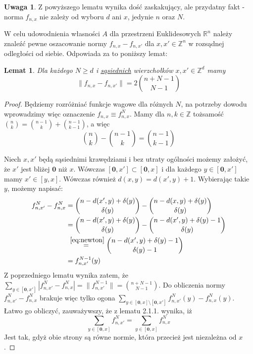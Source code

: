 \documentclass[licencjacka]{pracamgr}
\theoremstyle{definition}
\theoremstyle{definition}
\newtheorem{remark}{Uwaga}[section]
\theoremstyle{definition}
\theoremstyle{definition}
\theoremstyle{definition}
\theoremstyle{plain}
\newtheorem{lemma}{Lemat}[section]
\theoremstyle{plain}
\begin{document}
\begin{remark}
	Z powyższego lematu wynika dość zaskakujący, ale przydatny fakt - norma 
	$ f_{n,x} $ nie zależy od wyboru $ d $ ani $ x $, jedynie $ n $ oraz $ N $.
\end{remark}

W celu udowodnienia własności $ A $ dla przestrzeni Euklidesowych $ \mathbb{R}^n $ 
należy znaleźć pewne oszacowanie normy $ f_{n,x} - f_{n,x'} $ dla $ x,x' \in 
\mathbb{Z}^n $ w rozsądnej odległości od siebie. Odpowiada za to poniższy lemat:

\begin{lemma}
	Dla każdego $ N \geq d $ i \underline{sąsiednich} wierzchołków $ x,x'\in \mathbb{Z}^d $
	mamy $$ \| f_{n,x} - f_{n,x'}\| = 2 {n + N - 1 \choose N -1} $$
\end{lemma}
\begin{proof}
	Będziemy rozróżniać funkcje wagowe dla różnych $ N $, na potrzeby dowodu wprowadzimy 
	więc oznaczenie $ f_{n,x} \equiv f_{n,x}^N $. Mamy dla $ n,k \in \mathbb{Z} $ tożsamość 
	$ {n \choose k } = {n -1\choose k} + {n-1 \choose k-1} $, a więc 
	\begin{equation} \label{eq:newton}
		{n \choose k} - {n -1\choose k} = {n - 1 \choose k - 1}
	\end{equation} 

	Niech $ x,x' $ będą sąsiednimi krawędziami i bez utraty ogólności możemy założyć, 
	że $ x'$ jest bliżej $ \textbf{0} $ niż $ x $. Wówczas $[\textbf{0}, x'] \subset 
	[\textbf{0},x]$ i dla każdego $ y \in [\textbf{0},x'] $ mamy $ x' \in [y,x] $.
	Wówczas również $ d(x,y) = d(x',y) + 1 $. Wybierając takie $ y $, możemy napisać:
	\begin{align*}
		f_{n,x'}^N - f_{n,x}^N & = {n - d(x',y) + \delta(y) \choose \delta(y)} - 
		{n - d(x,y) + \delta(y) \choose \delta(y)} \\
		&= {n - d(x',y) + \delta(y) \choose \delta(y)} - {n - d(x',y) + \delta(y) - 1 
		\choose \delta(y)} \\
		& \stackrel{~\ref{eq:newton}}{=} {n - d(x',y) + \delta(y) - 1 \choose \delta(y) - 1} \\
		& = f_{n,x'}^{N-1}(y)
	\end{align*}
	Z poprzedniego lematu wynika zatem, że $\sum_{y \in [\textbf{0}, x']} \left| 
	f_{n,x'}^N - f_{n,x}^N \right| = \| f_{n,x'}^{N-1}\| = {n + N - 1 \choose N - 1} $. Do 
	obliczenia normy $ f_{n,x'}^N - f_{n,x}^N $ brakuje więc tylko ogona 
	$ \sum_{y \in [\textbf{0},x] \setminus [\textbf{0}, x']} f_{n,x'}^N(y) - f_{n,x}^N(y) $. 
	Łatwo go obliczyć, zauważywszy, że z lematu 2.1.1. wynika, iż
	$$ \sum\limits_{y \in [\textbf{0},x]} f_{n,x'}^N =   
		\sum\limits_{y \in [\textbf{0},x]} f_{n,x}^N $$
	Jest tak, gdyż obie strony są równe normie, która przecież jest niezależna od $ x $.
	

\end{proof}
\end{document}
